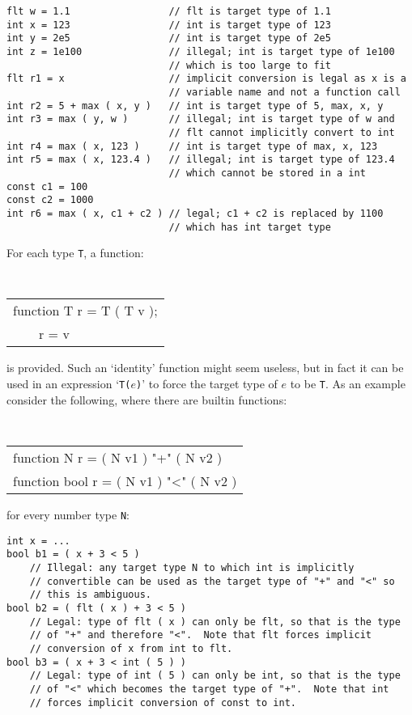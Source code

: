 \documentclass[12pt]{article}
\newenvironment{indpar}[1][0.3in]%
	{\begin{list}{}%
		     {\setlength{\itemsep}{0in}%
		      \setlength{\topsep}{0in}%
		      \setlength{\parsep}{1ex}%
		      \setlength{\labelwidth}{#1}%
		      \setlength{\leftmargin}{#1}%
		      \addtolength{\leftmargin}{\labelsep}}%
	 \item}%
	{\end{list}}
\begin{document}
\begin{indpar}\begin{verbatim}
flt w = 1.1                 // flt is target type of 1.1
int x = 123                 // int is target type of 123
int y = 2e5                 // int is target type of 2e5
int z = 1e100               // illegal; int is target type of 1e100
                            // which is too large to fit
flt r1 = x                  // implicit conversion is legal as x is a
                            // variable name and not a function call
int r2 = 5 + max ( x, y )   // int is target type of 5, max, x, y
int r3 = max ( y, w )       // illegal; int is target type of w and
                            // flt cannot implicitly convert to int
int r4 = max ( x, 123 )     // int is target type of max, x, 123
int r5 = max ( x, 123.4 )   // illegal; int is target type of 123.4
                            // which cannot be stored in a int
const c1 = 100
const c2 = 1000
int r6 = max ( x, c1 + c2 ) // legal; c1 + c2 is replaced by 1100
                            // which has int target type
\end{verbatim}\end{indpar}

For each type {\tt T}, a function:
\begin{center} \tt
\begin{tabular}{l}
function T r = T ( T v ); \\
~~~~r = v
\end{tabular}
\end{center}
is provided.  Such an `identity' function might seem useless,
but in fact it can be used in an expression `{\tt T($e$)}' to
force the target type of $e$ to be {\tt T}.  As an example
consider the following, where there are builtin functions:
\begin{center} \tt
\begin{tabular}{l}
function N r = ( N v1 ) "+" ( N v2 ) \\
function bool r = ( N v1 ) "<" ( N v2 ) \\
\end{tabular}
\end{center}
for every number type {\tt N}:

\begin{indpar}\begin{verbatim}
int x = ...
bool b1 = ( x + 3 < 5 )
    // Illegal: any target type N to which int is implicitly
    // convertible can be used as the target type of "+" and "<" so
    // this is ambiguous.
bool b2 = ( flt ( x ) + 3 < 5 )
    // Legal: type of flt ( x ) can only be flt, so that is the type
    // of "+" and therefore "<".  Note that flt forces implicit
    // conversion of x from int to flt.
bool b3 = ( x + 3 < int ( 5 ) )
    // Legal: type of int ( 5 ) can only be int, so that is the type
    // of "<" which becomes the target type of "+".  Note that int
    // forces implicit conversion of const to int.
\end{verbatim}\end{indpar}
\end{document}
